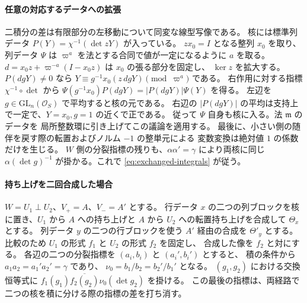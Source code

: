 \paragraph{任意の対応するデータへの拡張}
二積分の差は有限部分の左移動について同変な線型写像である。
核には標準列データ \(P(Y)=\chi^{-1}(\det zY)\) が入っている。
\(z x_0=I\) となる整列 \(x_0\) を取り、列データ \(\Psi\) は
\(\varpi^a\) を法とする合同で値が一定になるように \(a\) を取る。
\(d=x_0 z+\varpi^{-a}(I-x_0 z)\) は \(x_0\) の張る部分を固定し、
\(\ker z\) を拡大する。\(P(dgY)\ne0\) なら
\(Y\equiv g^{-1}x_0(z\,dgY)\pmod{\varpi^a}\) である。
右作用に対する指標 \(\chi^{-1}\circ\det\) から
\(\Psi(g^{-1}x_0)P(dgY)=|P(dgY)|\Psi(Y)\) を得る。
左辺を \(g\in\mathrm{GL}_n(\mathcal O_S)\) で平均すると核の元である。
右辺の \(|P(dgY)|\) の平均は支持上で一定で、\(Y=x_0,g=1\) の近くで正である。
従って \(\Psi\) 自身も核に入る。法 \(\mathfrak m\) のデータを
局所整数環に引き上げてこの議論を適用する。
最後に、小さい側の随伴を戻す際の転置およびノルム \(-1\) の整単元による
変数変換は絶対値 \(1\) の係数だけを生じる。
\(W\) 側の分裂指標の残りも、\(\alpha\alpha'=\gamma\) により両核に同じ
\(\alpha(\det g)^{-1}\) が掛かる。これで \eqref{eq:exchanged-integrals} が従う。

\paragraph{持ち上げを二回合成した場合}
\(W=U_1\perp U_2\)、\(V_+=A\)、\(V_-=A'\) とする。
行データ \(x\) の二つの列ブロックを核に置き、\(U_1\) から \(A\) への持ち上げと
\(A\) から \(U_2\) への転置持ち上げを合成して \(\Theta_x\) とする。
列データ \(y\) の二つの行ブロックを使う \(A'\) 経由の合成を \(\Theta'_y\) とする。
比較のため \(U_1\) の形式 \(f_1\) と \(U_2\) の形式 \(f_2\) を固定し、
合成した像を \(f_2\) と対にする。
各辺の二つの分裂指標を \((a_i,b_i)\) と \((a_i',b_i')\) とすると、
積の条件から \(a_1a_2=a_1'a_2'=\gamma\) であり、
\(\nu_0=b_1/b_2=b_2'/b_1'\) となる。
\((g_1,g_2)\) における交換恒等式に
\(f_1(g_1)\overline{f_2(g_2)}\nu_0(\det g_2)\) を掛ける。
この最後の指標は、両経路で二つの核を積に分ける際の指標の差を打ち消す。

